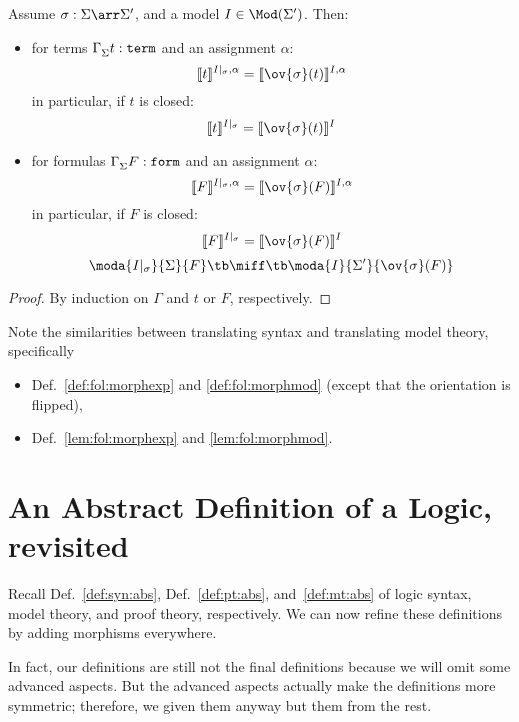 \begin{lemma}\label{lem:fol:morphmod}
Assume $\sigma:\Sigma\arr\Sigma'$, and a model $I\in\Mod(\Sigma')$. Then:
\begin{itemize}
\item for terms $\Gamma^{}_{\Sigma}t:\mathtt{term}$ and an assignment $\alpha$:
  \[\semm{t}{\reduce{\sigma}{I},\alpha} = \semm{\ov{\sigma}(t)}{I,\alpha}\]
  in particular, if $t$ is closed:
  \[\semm{t}{\reduce{\sigma}{I}} = \semm{\ov{\sigma}(t)}{I}\]
\item for formulas $\Gamma^{}_{\Sigma}F:\mathtt{form}$ and an assignment $\alpha$:
  \[\semm{F}{\reduce{\sigma}{I},\alpha} = \semm{\ov{\sigma}(F)}{I,\alpha}\]
  in particular, if $F$ is closed:
  \[\semm{F}{\reduce{\sigma}{I}} = \semm{\ov{\sigma}(F)}{I}\]
  \[\moda{\reduce{\sigma}{I}}{\Sigma}{F} \tb\miff\tb \moda{I}{\Sigma'}{\ov{\sigma}(F)}\]
\end{itemize}
\end{lemma}
\begin{proof}
By induction on $\Gamma$ and $t$ or $F$, respectively.
\end{proof}

\begin{remark}
Note the similarities between translating syntax and translating model theory, specifically
\begin{itemize}
\item Def.~\ref{def:fol:morphexp} and \ref{def:fol:morphmod} (except that the orientation is flipped),
\item Def.~\ref{lem:fol:morphexp} and \ref{lem:fol:morphmod}.
\end{itemize}
\end{remark}

\section{An Abstract Definition of a Logic, revisited}

Recall Def.~\ref{def:syn:abs}, Def.~\ref{def:pt:abs}, and~\ref{def:mt:abs} of logic syntax, model theory, and proof theory, respectively. We can now refine these definitions by adding morphisms everywhere.

In fact, our definitions are still not the final definitions because we will omit some advanced aspects. But the advanced aspects actually make the definitions more symmetric; therefore, we given them anyway but  them from the rest.

